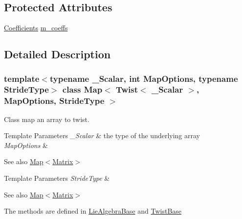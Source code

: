 \subsection*{Protected Attributes}
\begin{DoxyCompactItemize}
\item 
\hyperlink{class_map_3_01_twist_3_01___scalar_01_4_00_01_map_options_00_01_stride_type_01_4_aed5862495c86340dcb689412d79eb66a}{Coefficients} \hyperlink{class_map_3_01_twist_3_01___scalar_01_4_00_01_map_options_00_01_stride_type_01_4_a393cb065b2aa091a7a5b5c66eca9861a}{m\+\_\+coeffs}
\end{DoxyCompactItemize}


\subsection{Detailed Description}
\subsubsection*{template$<$typename \+\_\+\+Scalar, int Map\+Options, typename Stride\+Type$>$\newline
class Map$<$ Twist$<$ \+\_\+\+Scalar $>$, Map\+Options, Stride\+Type $>$}

Class map an array to twist. 


\begin{DoxyTemplParams}{Template Parameters}
{\em \+\_\+\+Scalar} & the type of the underlying array \\
\hline
{\em Map\+Options} & \\
\hline
\end{DoxyTemplParams}
\begin{DoxySeeAlso}{See also}
\hyperlink{class_map_3_01_twist_3_01___scalar_01_4_00_01_map_options_00_01_stride_type_01_4_a7bc49d9365cdda555f4d107d55a1c6b2}{Map$<$\+Matrix$>$} 
\end{DoxySeeAlso}

\begin{DoxyTemplParams}{Template Parameters}
{\em Stride\+Type} & \\
\hline
\end{DoxyTemplParams}
\begin{DoxySeeAlso}{See also}
\hyperlink{class_map_3_01_twist_3_01___scalar_01_4_00_01_map_options_00_01_stride_type_01_4_a7bc49d9365cdda555f4d107d55a1c6b2}{Map$<$\+Matrix$>$}

The methods are defined in \hyperlink{class_lie_algebra_base}{Lie\+Algebra\+Base} and \hyperlink{class_twist_base}{Twist\+Base} 
\end{DoxySeeAlso}


